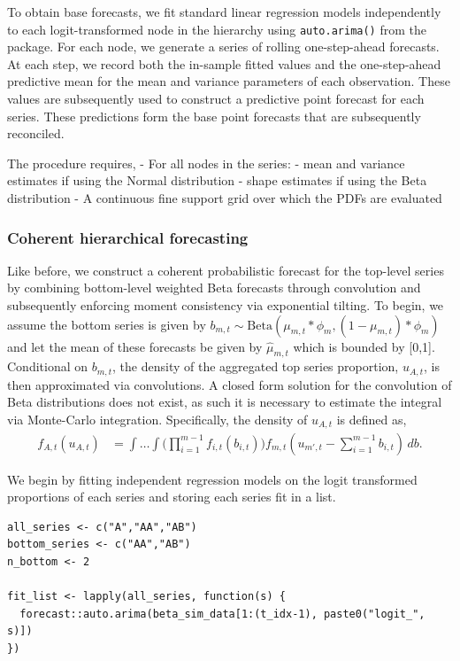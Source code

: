 To obtain base forecasts, we fit standard linear regression models independently to each logit-transformed node in the hierarchy using \texttt{auto.arima()} from the  package. For each node, we generate a series of rolling one-step-ahead forecasts. At each step, we record both the in-sample fitted values and the one-step-ahead predictive mean for the mean and variance parameters of each observation. These values are subsequently used to construct a predictive point forecast for each series. These predictions form the base point forecasts that are subsequently reconciled.

The procedure requires,
- For all nodes in the series:
- mean and variance estimates if using the Normal distribution
- shape estimates if using the Beta distribution
- A continuous fine support grid over which the PDFs are evaluated

\subsubsection{Coherent hierarchical forecasting}\label{coherent-hierarchical-forecasting-1}

Like before, we construct a coherent probabilistic forecast for the top-level series by combining bottom-level weighted Beta forecasts through convolution and subsequently enforcing moment consistency via exponential tilting. To begin, we assume the bottom series is given by \(b_{m, t} \sim \mathrm{Beta}(\mu_{m,t}*\phi_{m}, (1 - \mu_{m,t})*\phi_{m})\) and let the mean of these forecasts be given by \(\hat{\mu}_{m,t}\) which is bounded by {[}0,1{]}. Conditional on \(b_{m,t}\), the density of the aggregated top series proportion, \(u_{A,t}\), is then approximated via convolutions. A closed form solution for the convolution of Beta distributions does not exist, as such it is necessary to estimate the integral via Monte-Carlo integration. Specifically, the density of \(u_{A,t}\) is defined as,
\begin{align}
f_{A,t}(u_{A,t})
  &= \int \dots \int
    \bigg( \prod_{i=1}^{m-1} f_{i,t}(b_{i,t})   \bigg ) 
     f_{m,t}( u_{m',t} - \sum_{i=1}^{m-1} b_{i,t}) \, db.
\end{align}

We begin by fitting independent regression models on the logit transformed proportions of each series and storing each series fit in a list.

\begin{verbatim}
all_series <- c("A","AA","AB")
bottom_series <- c("AA","AB")
n_bottom <- 2

fit_list <- lapply(all_series, function(s) {
  forecast::auto.arima(beta_sim_data[1:(t_idx-1), paste0("logit_", s)])
})
\end{verbatim}

